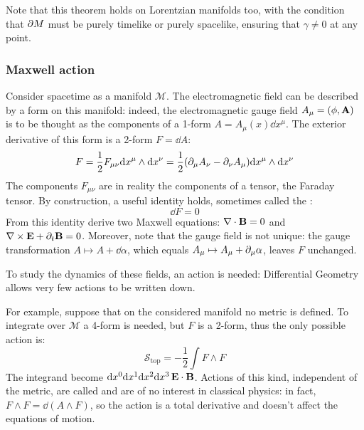 Note that this theorem holds on Lorentzian manifolds too, with the condition that $ \partial M $ must be purely timelike or purely spacelike, ensuring that $ \gamma \neq 0 $ at any point.

\subsubsection{Maxwell action}

Consider spacetime as a manifold $ \mathcal{M} $. The electromagnetic field can be described by a form on this manifold: indeed, the electromagnetic gauge field $ A_\mu = (\phi,\mathbf{A}) $ is to be thought as the components of a 1-form $ A = A_\mu(x) \dd x^\mu $. The exterior derivative of this form is a 2-form $ F = \dd A $:
\begin{equation*}
  F = \frac{1}{2} F_{\mu \nu} \mathrm{d} x^\mu \wedge \mathrm{d} x^\nu = \frac{1}{2} (\partial_\mu A_\nu - \partial_\nu A_\mu) \mathrm{d} x^\mu \wedge \mathrm{d} x^\nu
\end{equation*}
The components $ F_{\mu \nu} $ are in reality the components of a tensor, the Faraday tensor. By construction, a useful identity holds, sometimes called the :
\begin{equation}
  \dd F = 0
\end{equation}
From this identity derive two Maxwell equations: $ \nabla\cdot\mathbf{B} = 0 $ and $ \nabla\times\mathbf{E} + \partial_t \mathbf{B} = 0 $. Moreover, note that the gauge field is not unique: the gauge transformation $ A \mapsto A + \dd \alpha $, which equals $ A_\mu \mapsto A_\mu + \partial_\mu \alpha $, leaves $ F $ unchanged.

To study the dynamics of these fields, an action is needed: Differential Geometry allows very few actions to be written down.

For example, suppose that on the considered manifold no metric is defined. To integrate over $ \mathcal{M} $ a 4-form is needed, but $ F $ is a 2-form, thus the only possible action is:
\begin{equation}
  \mathcal{S}_{\text{top}} = - \frac{1}{2} \int F \wedge F
\end{equation}
The integrand become $ \mathrm{d} x^0 \mathrm{d} x^1 \mathrm{d} x^2 \mathrm{d} x^3 \, \mathbf{E}\cdot\mathbf{B} $. Actions of this kind, independent of the metric, are called  and are of no interest in classical physics: in fact, $ F \wedge F = \dd (A \wedge F) $, so the action is a total derivative and doesn't affect the equations of motion.

